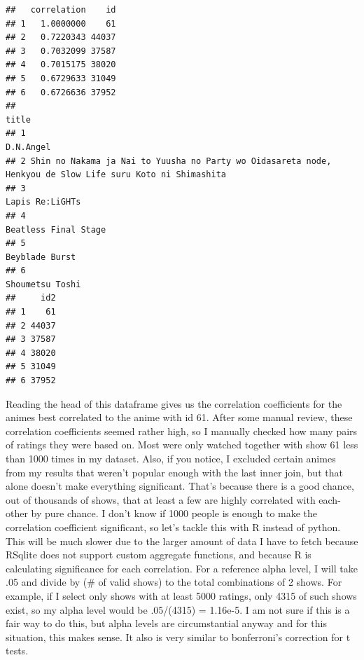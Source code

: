 \documentclass[
]{article}
\begin{document}
\begin{verbatim}
##   correlation    id
## 1   1.0000000    61
## 2   0.7220343 44037
## 3   0.7032099 37587
## 4   0.7015175 38020
## 5   0.6729633 31049
## 6   0.6726636 37952
##                                                                                                       title
## 1                                                                                                 D.N.Angel
## 2 Shin no Nakama ja Nai to Yuusha no Party wo Oidasareta node, Henkyou de Slow Life suru Koto ni Shimashita
## 3                                                                                           Lapis Re:LiGHTs
## 4                                                                                      Beatless Final Stage
## 5                                                                                            Beyblade Burst
## 6                                                                                           Shoumetsu Toshi
##     id2
## 1    61
## 2 44037
## 3 37587
## 4 38020
## 5 31049
## 6 37952
\end{verbatim}

Reading the head of this dataframe gives us the correlation coefficients
for the animes best correlated to the anime with id 61. After some
manual review, these correlation coefficients seemed rather high, so I
manually checked how many pairs of ratings they were based on. Most were
only watched together with show 61 less than 1000 times in my dataset.
Also, if you notice, I excluded certain animes from my results that
weren't popular enough with the last inner join, but that alone doesn't
make everything significant. That's because there is a good chance, out
of thousands of shows, that at least a few are highly correlated with
each-other by pure chance. I don't know if 1000 people is enough to make
the correlation coefficient significant, so let's tackle this with R
instead of python. This will be much slower due to the larger amount of
data I have to fetch because RSqlite does not support custom aggregate
functions, and because R is calculating significance for each
correlation. For a reference alpha level, I will take .05 and divide by
(\# of valid shows) to the total combinations of 2 shows. For example,
if I select only shows with at least 5000 ratings, only 4315 of such
shows exist, so my alpha level would be .05/(4315) = 1.16e-5. I am not
sure if this is a fair way to do this, but alpha levels are
circumstantial anyway and for this situation, this makes sense. It also
is very similar to bonferroni's correction for t tests.
\end{document}

